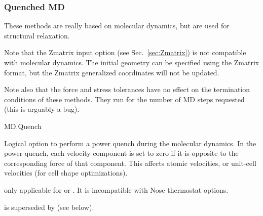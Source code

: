 \ifdeprecated

\subsubsection{Quenched MD}

These methods are really based on molecular dynamics, but are used for
structural relaxation.

Note that the Zmatrix input option (see
Sec.~\ref{sec:Zmatrix}) is not compatible with molecular dynamics. The
initial geometry can be specified using the Zmatrix format, but the
Zmatrix generalized coordinates will not be updated.

Note also that the force and stress tolerances have no effect on
the termination conditions of these methods. They run for the number
of MD steps requested (this is arguably a bug).

\begin{fdflogicalF}{MD.Quench}

  Logical option to perform a power quench during the molecular
  dynamics.  In the power quench, each velocity component is set to
  zero if it is opposite to the corresponding force of that
  component. This affects atomic velocities, or unit-cell velocities
  (for cell shape optimizations).

  \note only applicable for   or
  .
  It is incompatible with Nose thermostat options.  

  \note {} is superseded by  (see
  below).

\end{fdflogicalF}


